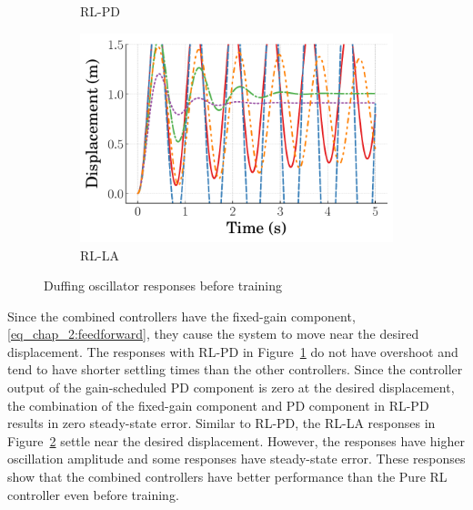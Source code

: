 \begin{figure}[tb]
\begin{subfigure}[b]{0.49\textwidth}
        \caption{RL-PD}
        \label{subfig_chap2:duffing_RL_PD_0_steps}
    \end{subfigure}
    \hfill
    \begin{subfigure}[b]{0.49\textwidth}
        \centering
        \includegraphics[width=\textwidth]{figures/figures_RL_model_based_control/time_responses_duffing/duffing_RL_LA/Displacement_1_init_0_steps.pdf}
        \caption{RL-LA}
        \label{subfig_chap2:duffing_RL_LA_0_steps}
    \end{subfigure}
    \hfill
    \caption{Duffing oscillator responses before training}
    \label{fig_chap2:duffing_0_steps}
\end{figure}
%
%
Since the combined controllers have the fixed-gain component, \eqref{eq_chap_2:feedforward}, they cause the system to move near the desired displacement. The responses with RL-PD in Figure~\ref{subfig_chap2:duffing_RL_PD_0_steps} do not have overshoot and tend to have shorter settling times than the other controllers. Since the controller output of the gain-scheduled PD component is zero at the desired displacement, the combination of the fixed-gain component and PD component in RL-PD results in zero steady-state error. Similar to RL-PD, the RL-LA responses in Figure~\ref{subfig_chap2:duffing_RL_LA_0_steps} settle near the desired displacement. However, the responses have higher oscillation amplitude and some responses have steady-state error. These responses show that the combined controllers have better performance than the Pure RL controller even before training.
%

